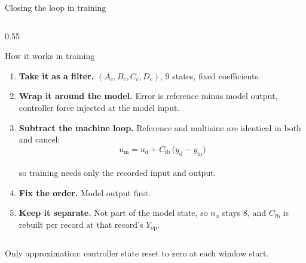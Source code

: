 \documentclass[aspectratio=169,11pt]{beamer}
\newcommand{\Cfb}{C_{\mathrm{fb}}}
\newcommand{\udata}{u_{\mathrm{d}}}
\newcommand{\umodel}{u_{\mathrm{m}}}
\newcommand{\ydata}{y_{\mathrm{d}}}
\newcommand{\ymodel}{y_{\mathrm{m}}}
\newcommand{\Yop}{Y_{\mathrm{op}}}
\begin{document}
\begin{frame}{Closing the loop in training}
\begin{columns}[T,onlytextwidth]
\begin{column}{0.55\textwidth}
\begin{block}{How it works in training}
\scriptsize
\begin{enumerate}\setlength\itemsep{0.25em}
  \item \textbf{Take it as a filter.} $(A_c,B_c,C_c,D_c)$, 9 states, fixed coefficients.
  \item \textbf{Wrap it around the model.} Error is reference minus model output, controller force
        injected at the model input.
  \item \textbf{Subtract the machine loop.} Reference and multisine are identical in both and
        cancel:
        \vspace{-0.3em}
        \[
          \umodel = \udata + \Cfb\,\bigl(\ydata - \ymodel\bigr)
        \]
        \vspace{-1.1em}
        \\ so training needs only the recorded input and output.
  \item \textbf{Fix the order.} Model output first.
  \item \textbf{Keep it separate.} Not part of the model state, so $n_x$ stays $8$, and $\Cfb$ is
        rebuilt per record at that record's $\Yop$.
\end{enumerate}
\end{block}
\end{column}

\end{columns}

\vspace{0.4em}
{\footnotesize
Only approximation: controller state reset to zero at each window start.}

\end{frame}
\end{document}
